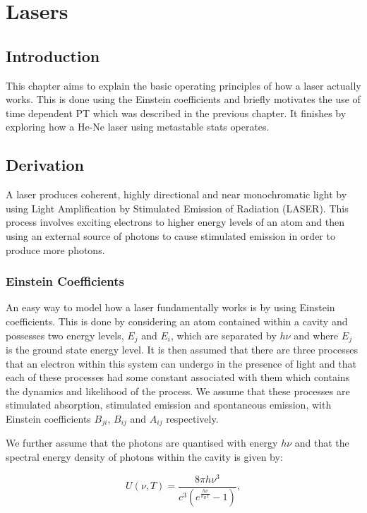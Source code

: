 \chapter{Lasers}
\label{chapt8}

\section{Introduction}

This chapter aims to explain the basic operating principles of how a laser actually works. This is done using the Einstein coefficients and briefly motivates the use of time dependent PT which was described in the previous chapter. It finishes by exploring how a He-Ne laser using metastable stats operates.

\section{Derivation}

A laser produces coherent, highly directional and near monochromatic light by using Light Amplification by Stimulated Emission of Radiation (LASER). This process involves exciting electrons to higher energy levels of an atom and then using an external source of photons to cause stimulated emission in order to produce more photons.

\subsection{Einstein Coefficients}

An easy way to model how a laser fundamentally works is by using Einstein coefficients. This is done by considering an atom contained within a cavity and possesses two energy levels, $E_j$ and $E_i$, which are separated by $h\nu$ and where $E_j$ is the ground state energy level. It is then assumed that there are three processes that an electron within this system can undergo in the presence of light and that each of these processes had some constant associated with them which contains the dynamics and likelihood of the process. We assume that these processes are stimulated absorption, stimulated emission and spontaneous emission, with Einstein coefficients $B_{ji}$, $B_{ij}$ and $A_{ij}$ respectively. 

\noindent We further assume that the photons are quantised with energy $h\nu$ and that the spectral energy density of photons within the cavity is given by:

\begin{equation}
    U(\nu, T) = \frac{8\pi h \nu^3}{c^3(e^{\frac{h\nu}{k_B T}} - 1)},
    \label{PlanckSpectralEnergyDensity}
\end{equation}

